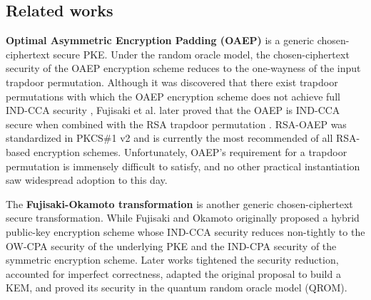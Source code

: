 \documentclass[journal=tches,submission]{iacrtrans}
\begin{document}
\subsection{Related works}
\textbf{Optimal Asymmetric Encryption Padding (OAEP)} \cite{DBLP:conf/eurocrypt/BellareR94}\cite{DBLP:conf/crypto/BellareDPR98} is a generic chosen-ciphertext secure PKE. Under the random oracle model, the chosen-ciphertext security of the OAEP encryption scheme reduces to the one-wayness of the input trapdoor permutation. Although it was discovered that there exist trapdoor permutations with which the OAEP encryption scheme does not achieve full IND-CCA security \cite{DBLP:journals/joc/Shoup02}, Fujisaki et al. later proved that the OAEP is IND-CCA secure when combined with the RSA trapdoor permutation \cite{DBLP:conf/crypto/FujisakiOPS01}\cite{DBLP:journals/cacm/RivestSA78}. RSA-OAEP was standardized in PKCS\#1 v2 \cite{rfc8017} and is currently the most recommended of all RSA-based encryption schemes. Unfortunately, OAEP's requirement for a trapdoor permutation is immensely difficult to satisfy, and no other practical instantiation saw widespread adoption to this day.

The \textbf{Fujisaki-Okamoto transformation} \cite{DBLP:conf/crypto/FujisakiO99}\cite{DBLP:journals/joc/FujisakiO13} is another generic chosen-ciphertext secure transformation. While Fujisaki and Okamoto originally proposed a hybrid public-key encryption scheme whose IND-CCA security reduces non-tightly to the OW-CPA security of the underlying PKE and the IND-CPA security of the symmetric encryption scheme. Later works \cite{DBLP:conf/ima/Dent03}\cite{DBLP:conf/tcc/HofheinzHK17}\cite{DBLP:conf/eurocrypt/DworkNR04}\cite{DBLP:conf/asiacrypt/HovelmannsHM22}\cite{bernstein2018towards}  tightened the security reduction, accounted for imperfect correctness, adapted the original proposal to build a KEM, and proved its security in the quantum random oracle model (QROM).
\end{document}
